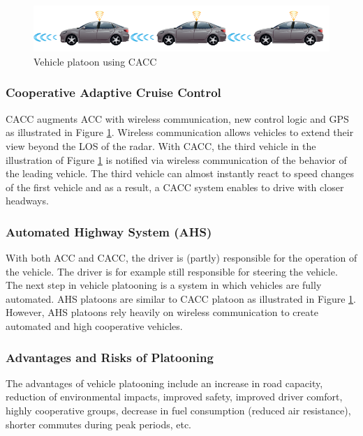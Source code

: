 \begin{figure}[h!]
    \includegraphics[width=1\textwidth]{figures/vehicleplatooningusingCACC.png}
    \centering
    \caption{Vehicle platoon using CACC}
    \label{fig:vehicleplatooningusingCACC}    
\end{figure}

\subsubsection{Cooperative Adaptive Cruise Control}
CACC augments ACC with wireless communication, new control logic and GPS as illustrated in Figure \ref{fig:vehicleplatooningusingCACC}. Wireless communication allows vehicles to extend their view beyond the LOS of the radar. With CACC, the third vehicle in the illustration of Figure \ref{fig:vehicleplatooningusingCACC} is notified via wireless communication of the behavior of the leading vehicle. The third vehicle can almost instantly react to speed changes of the first vehicle and as a result, a CACC system enables to drive with closer headways.

\subsubsection{Automated Highway System (AHS)}
With both ACC and CACC, the driver is (partly) responsible for the operation of the vehicle. The driver is for example still responsible for steering the vehicle. The next step in vehicle platooning is a system in which vehicles are fully automated. AHS platoons are similar to CACC platoon as illustrated in Figure \ref{fig:vehicleplatooningusingCACC}. However, AHS platoons rely heavily on wireless communication to create automated and high cooperative vehicles.

\subsubsection{Advantages and Risks of Platooning}
The advantages of vehicle platooning include \cite{de1997behavioral} an increase in road capacity, reduction of environmental impacts, improved safety, improved driver comfort, highly cooperative groups, decrease in fuel consumption (reduced air resistance), shorter commutes during peak periods, etc. 


